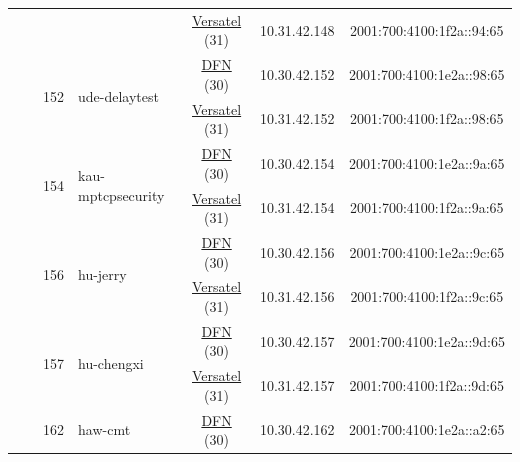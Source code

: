 \begin{small}
\begin{center}
\begin{longtable}{|c|c|c|c|c|c|c|c|}
  &  &  &  & \multicolumn{2}{|c|}{\tiny{\href{http://www.versatel.de}{Versatel} (31)}} & \tiny{10.31.42.148} & \tiny{2001:700:4100:1f2a::94:65} \\* \cline{3-3}\cline{4-4}\cline{5-5}\cline{6-6}\cline{7-7}\cline{8-8}
  &  & \multirow{2}{*}{\tiny{152}} & \multicolumn{1}{|l|}{\multirow{2}{*}{\tiny{ude-delaytest}}} & \multicolumn{2}{|c|}{\tiny{\href{https://www.dfn.de}{DFN} (30)}} & \tiny{10.30.42.152} & \tiny{2001:700:4100:1e2a::98:65} \\* \cline{5-5}\cline{6-6}\cline{7-7}\cline{8-8}
  &  &  &  & \multicolumn{2}{|c|}{\tiny{\href{http://www.versatel.de}{Versatel} (31)}} & \tiny{10.31.42.152} & \tiny{2001:700:4100:1f2a::98:65} \\* \cline{3-3}\cline{4-4}\cline{5-5}\cline{6-6}\cline{7-7}\cline{8-8}
  &  & \multirow{2}{*}{\tiny{154}} & \multicolumn{1}{|l|}{\multirow{2}{*}{\tiny{kau-mptcpsecurity}}} & \multicolumn{2}{|c|}{\tiny{\href{https://www.dfn.de}{DFN} (30)}} & \tiny{10.30.42.154} & \tiny{2001:700:4100:1e2a::9a:65} \\* \cline{5-5}\cline{6-6}\cline{7-7}\cline{8-8}
  &  &  &  & \multicolumn{2}{|c|}{\tiny{\href{http://www.versatel.de}{Versatel} (31)}} & \tiny{10.31.42.154} & \tiny{2001:700:4100:1f2a::9a:65} \\* \cline{3-3}\cline{4-4}\cline{5-5}\cline{6-6}\cline{7-7}\cline{8-8}
  &  & \multirow{2}{*}{\tiny{156}} & \multicolumn{1}{|l|}{\multirow{2}{*}{\tiny{hu-jerry}}} & \multicolumn{2}{|c|}{\tiny{\href{https://www.dfn.de}{DFN} (30)}} & \tiny{10.30.42.156} & \tiny{2001:700:4100:1e2a::9c:65} \\* \cline{5-5}\cline{6-6}\cline{7-7}\cline{8-8}
  &  &  &  & \multicolumn{2}{|c|}{\tiny{\href{http://www.versatel.de}{Versatel} (31)}} & \tiny{10.31.42.156} & \tiny{2001:700:4100:1f2a::9c:65} \\* \cline{3-3}\cline{4-4}\cline{5-5}\cline{6-6}\cline{7-7}\cline{8-8}
  &  & \multirow{2}{*}{\tiny{157}} & \multicolumn{1}{|l|}{\multirow{2}{*}{\tiny{hu-chengxi}}} & \multicolumn{2}{|c|}{\tiny{\href{https://www.dfn.de}{DFN} (30)}} & \tiny{10.30.42.157} & \tiny{2001:700:4100:1e2a::9d:65} \\* \cline{5-5}\cline{6-6}\cline{7-7}\cline{8-8}
  &  &  &  & \multicolumn{2}{|c|}{\tiny{\href{http://www.versatel.de}{Versatel} (31)}} & \tiny{10.31.42.157} & \tiny{2001:700:4100:1f2a::9d:65} \\* \cline{3-3}\cline{4-4}\cline{5-5}\cline{6-6}\cline{7-7}\cline{8-8}
  &  & \multirow{2}{*}{\tiny{162}} & \multicolumn{1}{|l|}{\multirow{2}{*}{\tiny{haw-cmt}}} & \multicolumn{2}{|c|}{\tiny{\href{https://www.dfn.de}{DFN} (30)}} & \tiny{10.30.42.162} & \tiny{2001:700:4100:1e2a::a2:65} \\* \cline{5-5}\cline{6-6}\cline{7-7}\cline{8-8}

\end{longtable}
\end{center}
\end{small}
